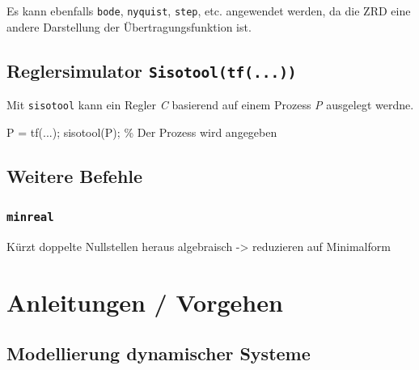 \documentclass[
  10pt,
  a4paper,
  twocolumn]{article}
\newenvironment{Shaded}{}{}
\newcommand{\CommentTok}[1]{\textcolor[rgb]{0.42,0.45,0.49}{#1}}
\newcommand{\NormalTok}[1]{\textcolor[rgb]{0.14,0.16,0.18}{#1}}
\newcommand{\OperatorTok}[1]{\textcolor[rgb]{0.14,0.16,0.18}{#1}}
\newcommand{\VariableTok}[1]{\textcolor[rgb]{0.89,0.38,0.04}{#1}}
\numberwithin{equation}{section}
\begin{document}
Es kann ebenfalls \texttt{bode}, \texttt{nyquist}, \texttt{step}, etc.
angewendet werden, da die ZRD eine andere Darstellung der
Übertragungsfunktion ist.

\hypertarget{reglersimulator-sisotooltf...}{%
\subsection{\texorpdfstring{Reglersimulator
\texttt{Sisotool(tf(...))}}{Reglersimulator Sisotool(tf(...))}}\label{reglersimulator-sisotooltf...}}

Mit \texttt{sisotool} kann ein Regler \emph{C} basierend auf einem
Prozess \emph{P} ausgelegt werdne.

\begin{Shaded}
\begin{Highlighting}[]
\VariableTok{P} \OperatorTok{=} \VariableTok{tf}\NormalTok{(}\OperatorTok{...}\NormalTok{)}\OperatorTok{;}
\VariableTok{sisotool}\NormalTok{(}\VariableTok{P}\NormalTok{)}\OperatorTok{;} \CommentTok{\% Der Prozess wird angegeben}
\end{Highlighting}
\end{Shaded}

\hypertarget{weitere-befehle}{%
\subsection{Weitere Befehle}\label{weitere-befehle}}

\hypertarget{minreal}{%
\subsubsection{\texorpdfstring{\texttt{minreal}}{minreal}}\label{minreal}}

Kürzt doppelte Nullstellen heraus algebraisch -\textgreater{} reduzieren
auf Minimalform

\hypertarget{anleitungen-vorgehen}{%
\section{\texorpdfstring{\faFile*[regular] Anleitungen /
Vorgehen}{ Anleitungen / Vorgehen}}\label{anleitungen-vorgehen}}

\hypertarget{modellierung-dynamischer-systeme}{%
\subsection{Modellierung dynamischer
Systeme}\label{modellierung-dynamischer-systeme}}
\end{document}
